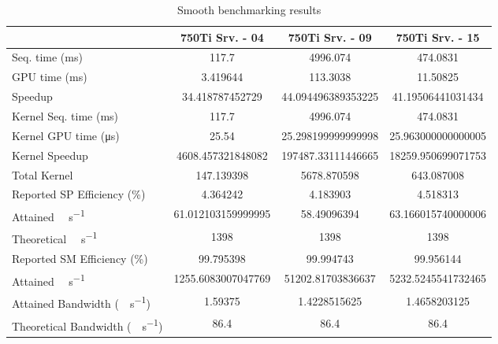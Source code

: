 \begin{table}[H]
	\centering
	\caption{Smooth benchmarking results}
	\label{tab:smooth-results}
	\begin{tabular}{lS[table-format=7.1]S[table-format=7.1]S[table-format=7.1]}
		\toprule
			~ & {\textbf{750Ti Srv. - 04}} & {\textbf{750Ti Srv. - 09}} & {\textbf{750Ti Srv. - 15}} \\
		\midrule
			{Seq. time (\si{\milli\second})} & 117.7 & 4996.074 & 474.0831 \\
			{GPU time (\si{\milli\second})} & 3.419644 & 113.3038 & 11.50825 \\
			{Speedup} & 34.418787452729 &44.094496389353225 & 41.19506441031434 \\
		\midrule
			{Kernel Seq. time (\si{\milli\second})} & 117.7 & 4996.074 & 474.0831 \\
			{Kernel GPU time (\si{\micro\second})} & 25.54 & 25.298199999999998 & 25.963000000000005 \\
			{Kernel Speedup} & 4608.457321848082 & 197487.33111446665 & 18259.950699071753 \\
		\midrule
			{Total Kernel \si{\mega\flops}} & 147.139398 & 5678.870598 & 643.087008 \\
			{Reported SP Efficiency (\si{\percent})} & 4.364242 & 4.183903 & 4.518313 \\
			{Attained \si{\giga\flops\per\second}} & 61.012103159999995 & 58.49096394 & 63.166015740000006 \\
			{Theoretical \si{\giga\flops\per\second}} & 1398 & 1398 & 1398 \\
		\midrule
			{Reported SM Efficiency (\si{\percent})} & 99.795398 & 99.994743 & 99.956144 \\
			{Attained \si{\giga\iops\per\second}} & 1255.6083007047769 & 51202.81703836637 & 5232.5245541732465 \\			
		\midrule
			{Attained Bandwidth (\si{\giga\byte\per\second})} & 1.59375 & 1.4228515625  & 1.4658203125 \\
			{Theoretical Bandwidth (\si{\giga\byte\per\second})}	& 86.4 & 86.4 & 86.4 \\
		\bottomrule
	\end{tabular}
\end{table}